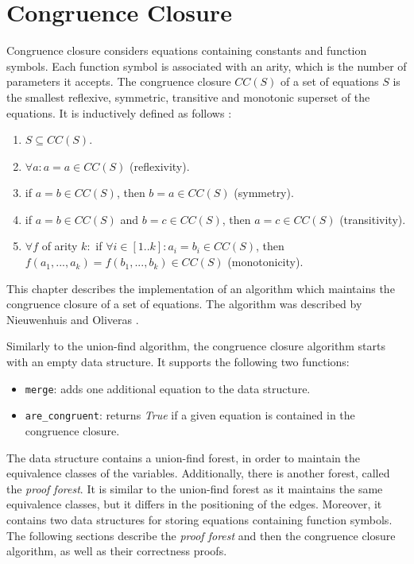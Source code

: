 
\chapter{Congruence Closure} \label{chapter:congruence_closure}

Congruence closure considers equations containing constants and function symbols. Each function symbol is associated with an arity, which is the number of parameters it accepts. The congruence closure $CC(S)$ of a set of equations $S$ is the smallest reflexive, symmetric, transitive and monotonic superset of the equations. It is inductively defined as follows \cite{congruenceclosure-ac}:

\begin{enumerate}[label=(\roman*)]
\itemsep0em
    \item $S \subseteq CC(S)$.
    \item $\forall a: a = a \in CC(S)$ (reflexivity).
    \item if $a = b \in CC(S)$, then $b = a \in CC(S)$ (symmetry).
    \item if $a = b \in CC(S)$ and $b = c \in CC(S)$, then $a = c \in CC(S)$ (transitivity).
    \item $\forall f$ of arity $k :$ if $\forall i \in [1..k]: a_i = b_i \in CC(S)$, then $f(a_1, ..., a_k) = f(b_1,..., b_k) \in CC(S)$ (monotonicity).
\end{enumerate}

This chapter describes the implementation of an algorithm which maintains the congruence closure of a set of equations.
The algorithm was described by Nieuwenhuis and Oliveras \cite{Nieuwenhuis}.

Similarly to the union-find algorithm, the congruence closure algorithm starts with an empty data structure. It supports the following two functions:
\begin{itemize}
    \item \lstinline|merge|: adds one additional equation to the data structure.
    \item  \lstinline|are_congruent|: returns \emph{True} if a given equation is contained in the congruence closure.
\end{itemize}

The data structure contains a union-find forest, in order to maintain the equivalence classes of the variables. Additionally, there is another forest, called the \emph{proof forest}. It is similar to the union-find forest as it maintains the same equivalence classes, but it differs in the positioning of the edges.
Moreover, it contains two data structures for storing equations containing function symbols. The following sections describe the \emph{proof forest} and then the congruence closure algorithm, as well as their correctness proofs.

